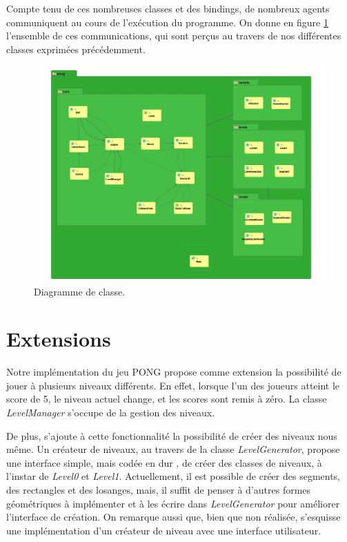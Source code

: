 \documentclass[a4paper,10pt]{article}
\theoremstyle{definition}
\begin{document}
    Compte tenu de ces nombreuses classes et des bindings, de nombreux agents communiquent au cours de l'exécution du programme. On donne en figure \ref{fig:diag} l'ensemble de ces communications, qui sont perçus au travers de nos différentes classes exprimées précédemment.
    	\begin{figure}[!h]
  	  \begin{center}
    	    \includegraphics[width=\textwidth]{Class_diagram.jpg}
    	    \caption{Diagramme de classe.}
    	    \label{fig:diag}
  	  \end{center}
	\end{figure}	

\section{Extensions}
	Notre implémentation du jeu PONG propose comme extension la possibilité de jouer à plusieurs niveaux différents. En effet, lorsque l'un des joueurs atteint le score de 5, le niveau actuel change, et les scores sont remis à zéro. La classe \emph{LevelManager} s'occupe de la gestion des niveaux.
	
	De plus, s'ajoute à cette fonctionnalité la possibilité de créer des niveaux nous même. Un créateur de niveaux, au travers de la classe \emph{LevelGenerator}, propose une interface simple, mais \og codée en dur \fg{}, de créer des classes de niveaux, à l'instar de \emph{Level0} et \emph{Level1}. Actuellement, il est possible de créer des segments, des rectangles et des losanges, mais, il suffit de penser à d'autres formes géométriques à implémenter et à les écrire dans \emph{LevelGenerator} pour améliorer l'interface de création. On remarque aussi que, bien que non réalisée, s'esquisse une implémentation d'un créateur de niveau avec une interface utilisateur.
\end{document}
